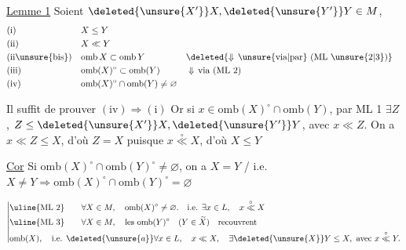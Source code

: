 


\uline{Lemme 1} Soient $\deleted{\unsure{X'}}X,\deleted{\unsure{Y'}}Y\in M$,   
\[
\begin{aligned}
&\text{(i)} && X\leq Y\\
&\text{(ii)} && X\ll Y\\
&\text{(ii\unsure{bis})} && \mathrm{omb}\,X\subset\mathrm{omb}\,Y
     && \deleted{\Downarrow\,\text{\unsure{via|par} (ML \unsure{2|3})}}\\
&\text{(iii)} && \mathrm{omb}(X)^\circ\subset\mathrm{omb}(Y)
     && \Downarrow\,\text{via (ML 2)}\\
&\text{(iv)} && \mathrm{omb}(X)^\circ\cap\mathrm{omb}(Y)\neq\varnothing
\end{aligned}
\]

Il suffit de prouver $(\mathrm{iv})\Longrightarrow(\mathrm{i})$ Or si $x\in\mathrm{omb}(X)^\circ\cap\mathrm{omb}(Y)$,  par ML 1 $\exists Z$, $Z\leq\deleted{\unsure{X'}}X,\deleted{\unsure{Y'}}Y$, avec $x\ll Z$\deleted{\unsure{$\ll$}}. On a $x\ll Z\leq X$, d'où $Z=X$ puisque $x\overset{\circ}{\ll}X$, d'où $X\leq Y$ 

\uline{Cor} Si $\mathrm{omb}(X)^\circ\cap\mathrm{omb}(Y)^\circ\neq\varnothing$, on a $X=Y$ / i.e. $X\neq Y\Rightarrow\mathrm{omb}(X)^\circ\cap\mathrm{omb}(Y)^\circ=\varnothing$

\[
\left|\begin{aligned}
&\uline{\text{ML 2}}\qquad \forall X\in M,\quad \mathrm{omb}(X)^\circ\neq\varnothing.\quad \text{i.e. }\exists x\in L,\quad x\overset{\circ}{\ll}X\\
&\uline{\text{ML 3}}\qquad \forall X\in M,\quad \text{les }\mathrm{omb}(Y)^\circ\quad(Y\in\widetilde X)\quad\text{recouvrent}\\
&\mathrm{omb}(X),\quad\text{i.e. }\deleted{\unsure{a}}\forall x\in L,\quad x\ll X,\quad\exists\deleted{\unsure{X}}Y\leq X,\ \text{avec }x\overset{\circ}{\ll}Y.
\end{aligned}\right.
\]

